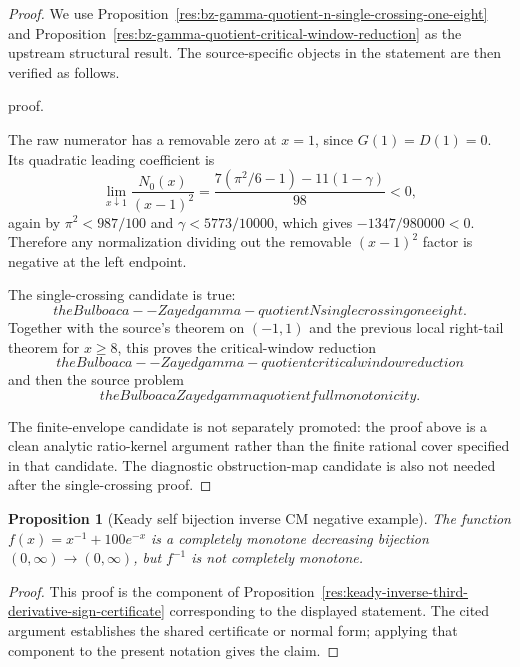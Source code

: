 \documentclass[11pt]{article}
\numberwithin{equation}{section}
\newtheorem{proposition}[theorem]{Proposition}
\theoremstyle{definition}
\theoremstyle{remark}
\newcommand{\1}{\mathbf 1}
\begin{document}
\begin{proof}
We use Proposition~\ref{res:bz-gamma-quotient-n-single-crossing-one-eight} and Proposition~\ref{res:bz-gamma-quotient-critical-window-reduction} as the upstream structural result. The source-specific objects in the statement are then verified as follows.

proof.

The raw numerator has a removable zero at \(x=1\), since \(G(1)=D(1)=0\).  Its
quadratic leading coefficient is
\[
\lim_{x\downarrow1}\frac{N_0(x)}{(x-1)^2}
=
\frac{7(\pi^2/6-1)-11(1-\gamma)}{98}<0,
\]
again by \(\pi^2<987/100\) and \(\gamma<5773/10000\), which gives
\(-1347/980000<0\).  Therefore any normalization dividing out the removable
\((x-1)^2\) factor is negative at the left endpoint.

The single-crossing candidate is true:
\[
the Bulboaca--Zayed gamma-quotient N single crossing one eight.
\]
Together with the source's theorem on \((-1,1)\) and the previous local
right-tail theorem for \(x\ge8\), this proves the critical-window reduction
\[
the Bulboaca--Zayed gamma-quotient critical window reduction
\]
and then the source problem
\[
the Bulboaca Zayed gamma quotient full monotonicity.
\]

The finite-envelope candidate is not separately promoted: the proof above is a
clean analytic ratio-kernel argument rather than the finite rational cover
specified in that candidate.  The diagnostic obstruction-map candidate is also
not needed after the single-crossing proof.
\end{proof}

\begin{proposition}[Keady self bijection inverse CM negative example]
\label{res:keady-self-bijection-inverse-cm-negative-example}
The function \(f(x)=x^{-1}+100e^{-x}\) is a completely monotone decreasing bijection \((0,\infty)\to(0,\infty)\), but \(f^{-1}\) is not completely monotone.
\end{proposition}

\begin{proof}
This proof is the component of Proposition~\ref{res:keady-inverse-third-derivative-sign-certificate} corresponding to the displayed statement.  The cited argument establishes the shared certificate or normal form; applying that component to the present notation gives the claim.
\end{proof}
\end{document}
